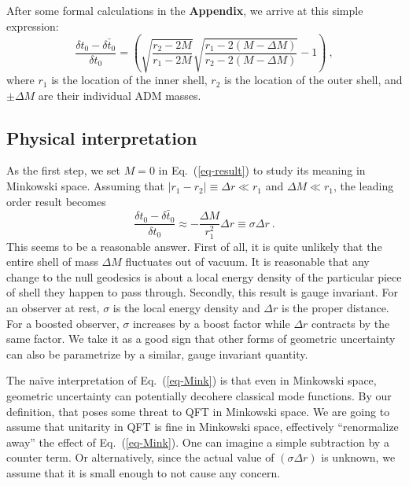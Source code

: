 \documentclass[aps,showpacs,twocolumn,floats,prd,superscriptaddress,nofootinbib]{revtex4-1}
\begin{document}
After some formal calculations in the {\bf Appendix}, we arrive at this simple expression:
\begin{equation}
\frac{\delta t_0 - \bar{\delta t_0}}{\delta t_0} = 
\left(\sqrt{\frac{r_2-2M}{r_1-2M}}\sqrt{\frac{r_1-2(M-\Delta M)}{r_2-2(M-\Delta M)}}-1\right)~,
\label{eq-result}
\end{equation}
where $r_1$ is the location of the inner shell, $r_2$ is the location of the outer shell, and $\pm\Delta M$ are their individual ADM masses.

\subsection{Physical interpretation}

As the first step, we set $M=0$ in Eq.~(\ref{eq-result}) to study its meaning in Minkowski space. Assuming that $|r_1-r_2| \equiv \Delta r \ll r_1$ and $\Delta M \ll r_1$, the leading order result becomes
\begin{equation}
\frac{\delta t_0 - \bar{\delta t_0}}{\delta t_0} \approx - \frac{\Delta M}{r_1^2} \Delta r 
\equiv \sigma \Delta r~.
\label{eq-Mink}
\end{equation}
This seems to be a reasonable answer. 
First of all, it is quite unlikely that the entire shell of mass $\Delta M$ fluctuates out of vacuum.
It is reasonable that any change to the null geodesics is about a local energy density of the particular piece of shell they happen to pass through.
Secondly, this result is gauge invariant. For an observer at rest, $\sigma$ is the local energy density and $\Delta r$ is the proper distance. 
For a boosted observer, $\sigma$ increases by a boost factor while $\Delta r$ contracts by the same factor.
We take it as a good sign that other forms of geometric uncertainty can also be parametrize by a similar, gauge invariant quantity.

The na\"ive interpretation of Eq.~(\ref{eq-Mink}) is that even in Minkowski space, geometric uncertainty can potentially decohere classical mode functions.
By our definition, that poses some threat to QFT in Minkowski space.
We are going to assume that unitarity in QFT is fine in Minkowski space, effectively ``renormalize away'' the effect of Eq.~(\ref{eq-Mink}).
One can imagine a simple subtraction by a counter term.
Or alternatively, since the actual value of $(\sigma\Delta r)$ is unknown, we assume that it is small enough to not cause any concern.
\end{document}
